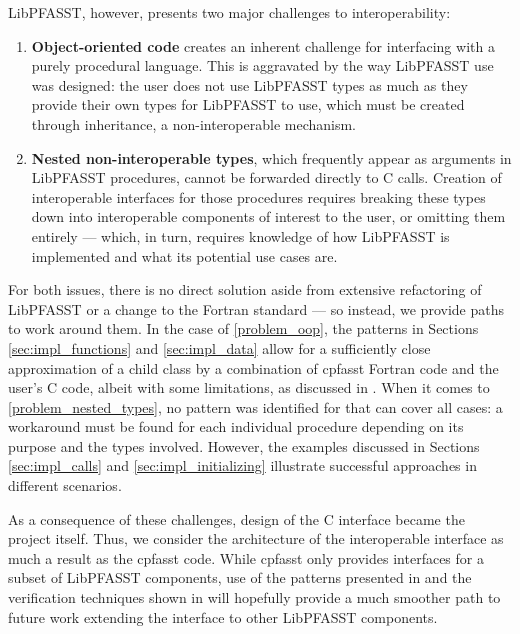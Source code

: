 LibPFASST, however, presents two major challenges to interoperability:
\begin{enumerate}
	\item \label{problem_oop} \textbf{Object-oriented code} creates an inherent challenge for interfacing with a purely procedural language. This is aggravated by the way LibPFASST use was designed: the user does not use LibPFASST types as much as they provide their own types for LibPFASST to use, which must be created through inheritance, a non-interoperable mechanism.
	\item \label{problem_nested_types} \textbf{Nested non-interoperable types}, which frequently appear as arguments in LibPFASST procedures, cannot be forwarded directly to C calls. Creation of interoperable interfaces for those procedures requires breaking these types down into interoperable components of interest to the user, or omitting them entirely --- which, in turn, requires knowledge of how LibPFASST is implemented and what its potential use cases are.
\end{enumerate}

For both issues, there is no direct solution aside from extensive refactoring of LibPFASST or a change to the Fortran standard --- so instead, we provide paths to work around them. In the case of \ref{problem_oop}, the patterns in Sections \ref{sec:impl_functions} and \ref{sec:impl_data} allow for a sufficiently close approximation of a child class by a combination of cpfasst Fortran code and the user's C code, albeit with some limitations, as discussed in . When it comes to \ref{problem_nested_types}, no pattern was identified for that can cover all cases: a workaround must be found for each individual procedure depending on its purpose and the types involved. However, the examples discussed in Sections \ref{sec:impl_calls} and \ref{sec:impl_initializing} illustrate successful approaches in different scenarios.

As a consequence of these challenges, design of the C interface became the project itself. Thus, we consider the architecture of the interoperable interface as much a result as the cpfasst code. While cpfasst only provides interfaces for a subset of LibPFASST components, use of the patterns presented in  and the verification techniques shown in  will hopefully provide a much smoother path to future work extending the interface to other LibPFASST components.


